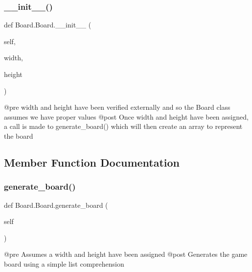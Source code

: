 \subsubsection{\texorpdfstring{\+\_\+\+\_\+init\+\_\+\+\_\+()}{\_\_init\_\_()}}
{\footnotesize\ttfamily def Board.\+Board.\+\_\+\+\_\+init\+\_\+\+\_\+ (\begin{DoxyParamCaption}\item[{}]{self,  }\item[{}]{width,  }\item[{}]{height }\end{DoxyParamCaption})}

\begin{DoxyVerb}@pre    width and height have been verified externally and so
the Board class assumes we have proper values
    @post   Once width and height have been assigned, a call is made to
generate_board() which will then create an array to represent the board
\end{DoxyVerb}
 

\subsection{Member Function Documentation}
\mbox{\label{class_board_1_1_board_a6c6aa64d586b48c8cbf7942a28ef4fba}} 
\subsubsection{\texorpdfstring{generate\+\_\+board()}{generate\_board()}}
{\footnotesize\ttfamily def Board.\+Board.\+generate\+\_\+board (\begin{DoxyParamCaption}\item[{}]{self }\end{DoxyParamCaption})}

\begin{DoxyVerb}@pre    Assumes a width and height have been assigned
    @post   Generates the game board using a simple list comprehension
\end{DoxyVerb}
 \mbox{\label{class_board_1_1_board_a8c672c7842189de03079a86c757244d7}} 
